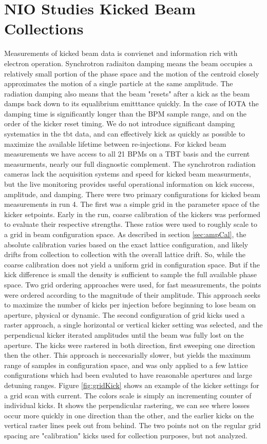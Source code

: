\section{NIO Studies Kicked Beam Collections}
Measurements of kicked beam data is convienet and information rich with electron operation. Synchrotron radiaiton damping means the beam occupies a relatively small portion of the phase space and the motion of the centroid closely approximates the motion of a single particle at the same amplitude. The radiation damping also means that the beam "resets" after a kick as the beam damps back down to its equalibrium emitttance quickly. In the case of IOTA the damping time is significantly longer than the BPM sample range, and on the order of the kicker reset timing. We do not introduce significant damping systematics in the tbt data, and can effectively kick as quickly as possible to maximize the available lifetime between re-injections. For kicked beam measurements we have access to all 21 BPMs on a TBT basis and the current measurments, nearly our full diagnostic complement. The synchrotron radiation cameras lack the acquisition systems and speed for kicked beam measurments, but the live monitoring provides useful operational information on kick success, amplitude, and damping. There were two primary configurations for kicked beam measurements in run 4. The first was a simple grid in the parameter space of the kicker setpoints. Early in the run, coarse calibration of the kickers was performed to evaluate their respective strengths. These ratios were used to roughly scale to a grid in beam configuration space. As described in section \ref{sec:ampCal}, the absolute calibration varies based on the exact lattice configuration, and likely drifts from collection to collection with the overall lattice drift. So, while the coarse calibration does not yield a uniform grid in configuration space. But if the kick difference is small the density is sufficient to sample the full available phase space. Two grid ordering approaches were used, for fast measurements, the points were ordered according to the magnitude of their amplitude. This approach seeks to maximize the number of kicks per injection before beginning to lose beam on aperture, physical or dynamic. The second configuration of grid kicks used a raster approach, a single horizontal or vertical kicker setting was selected, and the perpendicual kicker iterated amplitudes until the beam was fully lost on the aperture. The kicks were rastered in both direction, first sweeping one direction then the other. This approach is neccesarially slower, but yields the maximum range of samples in configuration space, and was only applied to a few lattice configurations which had been evaluted to have reasonable apertures and large detuning ranges. Figure \ref{fig:gridKick} shows an example of the kicker settings for a grid scan with current. The colors scale is simply an incrementing counter of individual kicks. It shows the perpendicular rastering, we can see where losses occur more quickly in one direction than the other, and the earlier kicks on the vertical raster lines peek out from behind. The two points not on the regular grid spacing are "calibration" kicks used for collection purposes, but not analyzed.

